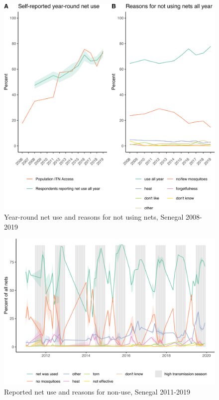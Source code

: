 \documentclass[review,
3p]{elsarticle} %
\begin{document}
\begin{figure}

{\centering \includegraphics[width=0.8\linewidth]{reasons_paper_files/figure-latex/fig_sen-1} 

}

\caption{\label{fig_sen}Year-round net use and reasons for not using nets, Senegal 2008-2019}\label{fig:fig_sen}
\end{figure}

\begin{figure}

{\centering \includegraphics[width=0.8\linewidth]{reasons_paper_files/figure-latex/seasons_fig-1} 

}

\caption{\label{seasons_fig}Reported net use and reasons for non-use, Senegal 2011-2019}\label{fig:seasons_fig}
\end{figure}
\end{document}
